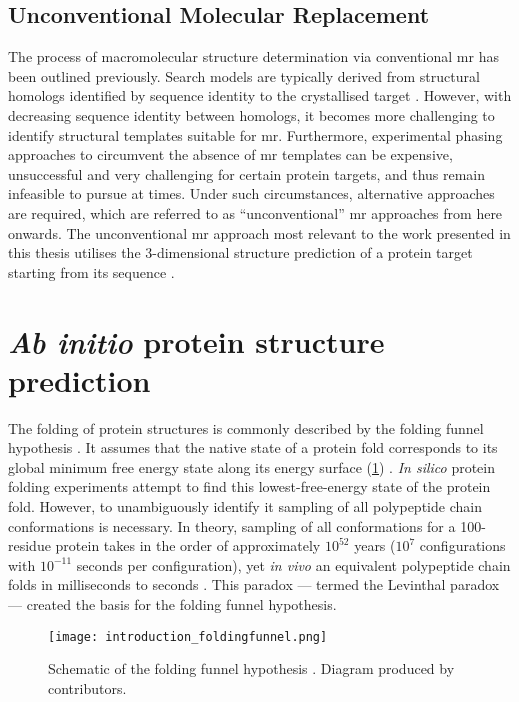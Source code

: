 \subsection{Unconventional Molecular Replacement}
The process of macromolecular structure determination via conventional \gls{mr} has been outlined previously. Search models are typically derived from structural homologs identified by sequence identity to the crystallised target \cite{Rupp2010-nc}. However, with decreasing sequence identity between homologs, it becomes more challenging to identify structural templates suitable for \gls{mr}. Furthermore, experimental phasing approaches to circumvent the absence of \gls{mr} templates can be expensive, unsuccessful and very challenging for certain protein targets, and thus remain infeasible to pursue at times. Under such circumstances, alternative approaches are required, which are referred to as ``unconventional'' \gls{mr} approaches from here onwards. The unconventional \gls{mr} approach most relevant to the work presented in this thesis utilises the 3-dimensional structure prediction of a protein target starting from its sequence \cite{Qian2007-vo,Rigden2008-vo,Das2009-uz}. 
 
%
%

\section{\textit{Ab initio} protein structure prediction} \label{sec:introduction_structure_prediction}
The folding of protein structures is commonly described by the folding funnel hypothesis \cite{Leopold1992-yf}. It assumes that the native state of a protein fold corresponds to its global minimum free energy state along its energy surface (\cref{fig:introduction_foldingfunnel}) \cite{Anfinsen1973-in}. \textit{In silico} protein folding experiments attempt to find this lowest-free-energy state of the protein fold. However, to unambiguously identify it sampling of all polypeptide chain conformations is necessary. In theory, sampling of all conformations for a 100-residue protein takes in the order of approximately $10^{52}$ years ($10^7$ configurations with $10^{-11}$ seconds per configuration), yet \textit{in vivo} an equivalent polypeptide chain folds in milliseconds to seconds \cite{Levinthal1969-bn,Karplus2011-jh}. This paradox --- termed the Levinthal paradox \cite{Levinthal1969-bn} --- created the basis for the folding funnel hypothesis.  

\begin{figure}[H]
    \centering
    \texttt{[image: introduction\_foldingfunnel.png]}
    \caption[Schematic of the folding funnel hypothesis.]{Schematic of the folding funnel hypothesis \cite{Leopold1992-yf}. Diagram produced by \textcite{Wikipedia-FoldingFunnel} contributors.}
    \label{fig:introduction_foldingfunnel}
\end{figure}

